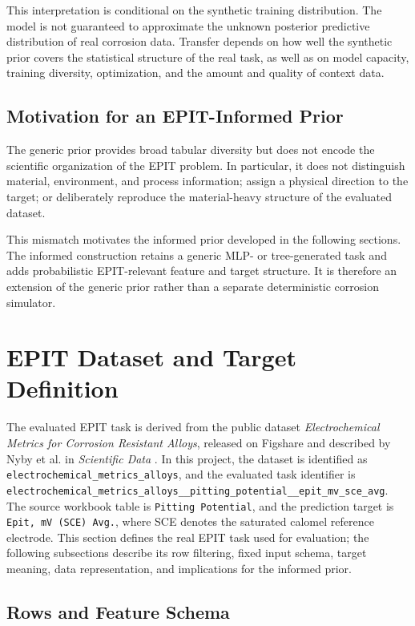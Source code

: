 \documentclass{article}
\begin{document}
This interpretation is conditional on the synthetic training distribution. The model is not guaranteed to approximate the unknown posterior predictive distribution of real corrosion data. Transfer depends on how well the synthetic prior covers the statistical structure of the real task, as well as on model capacity, training diversity, optimization, and the amount and quality of context data.

\subsection{Motivation for an EPIT-Informed Prior}

The generic prior provides broad tabular diversity but does not encode the scientific organization of the EPIT problem. In particular, it does not distinguish material, environment, and process information; assign a physical direction to the target; or deliberately reproduce the material-heavy structure of the evaluated dataset.

This mismatch motivates the informed prior developed in the following sections. The informed construction retains a generic MLP- or tree-generated task and adds probabilistic EPIT-relevant feature and target structure. It is therefore an extension of the generic prior rather than a separate deterministic corrosion simulator.

\section{EPIT Dataset and Target Definition}
\label{sec:epit-dataset}

The evaluated EPIT task is derived from the public dataset
\textit{Electrochemical Metrics for Corrosion Resistant Alloys}, released on
Figshare and described by Nyby et al. in \textit{Scientific Data}
\cite{nyby2021electrochemical}. In this project, the dataset is identified as
\texttt{electrochemical\_metrics\_alloys}, and the evaluated task identifier is
\texttt{electrochemical\_metrics\_alloys\_\_pitting\_potential\_\_epit\_mv\_sce\_avg}.
The source workbook table is \texttt{Pitting Potential}, and the prediction target
is \texttt{Epit, mV (SCE) Avg.}, where SCE denotes the saturated calomel reference
electrode. This section defines the real EPIT task used for evaluation; the
following subsections describe its row filtering, fixed input schema, target
meaning, data representation, and implications for the informed prior.

\subsection{Rows and Feature Schema}
\end{document}
